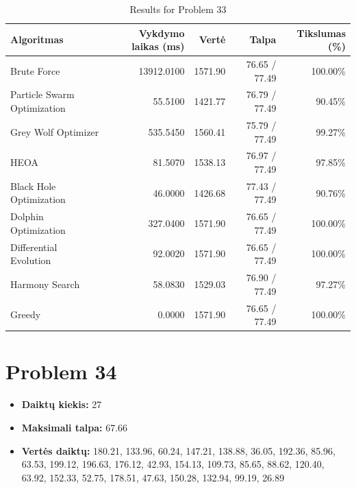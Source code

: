 \documentclass[a4paper,11pt]{article}
\begin{document}
\begin{table}[h!]
\centering
\begin{tabular}{lrrrr}
\toprule
\textbf{Algoritmas} & \textbf{Vykdymo laikas (ms)} & \textbf{Vertė} & \textbf{Talpa} & \textbf{Tikslumas (\%)} \\
\midrule
Brute Force & 13912.0100 & 1571.90 & 76.65 / 77.49 & 100.00\% \\
Particle Swarm Optimization & 55.5100 & 1421.77 & 76.79 / 77.49 & 90.45\% \\
Grey Wolf Optimizer & 535.5450 & 1560.41 & 75.79 / 77.49 & 99.27\% \\
HEOA & 81.5070 & 1538.13 & 76.97 / 77.49 & 97.85\% \\
Black Hole Optimization & 46.0000 & 1426.68 & 77.43 / 77.49 & 90.76\% \\
Dolphin Optimization & 327.0400 & 1571.90 & 76.65 / 77.49 & 100.00\% \\
Differential Evolution & 92.0020 & 1571.90 & 76.65 / 77.49 & 100.00\% \\
Harmony Search & 58.0830 & 1529.03 & 76.90 / 77.49 & 97.27\% \\
Greedy & 0.0000 & 1571.90 & 76.65 / 77.49 & 100.00\% \\
\bottomrule
\end{tabular}
\caption{Results for Problem 33}
\end{table}
\clearpage

\section*{Problem 34}
\begin{itemize}
    \item \textbf{Daiktų kiekis:} 27
    \item \textbf{Maksimali talpa:} 67.66
    \item \textbf{Vertės daiktų:} 180.21, 133.96, 60.24, 147.21, 138.88, 36.05, 192.36, 85.96, 63.53, 199.12, 196.63, 176.12, 42.93, 154.13, 109.73, 85.65, 88.62, 120.40, 63.92, 152.33, 52.75, 178.51, 47.63, 150.28, 132.94, 99.19, 26.89
\end{itemize}
\end{document}
